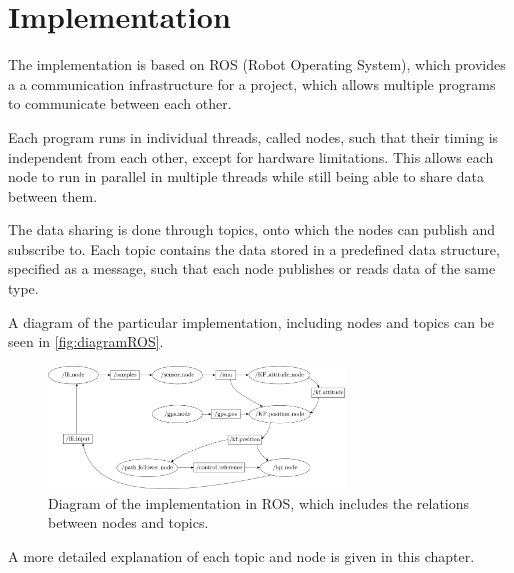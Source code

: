 \chapter{Implementation}
The implementation is based on ROS (Robot Operating System), which provides a a communication infrastructure for a project, which allows multiple programs to communicate between each other. 

Each program runs in individual threads, called nodes, such that their timing is independent from each other, except for hardware limitations. This allows each node to run in parallel in multiple threads while still being able to share data between them.

The data sharing is done through topics, onto which the nodes can publish and subscribe to. Each topic contains the data stored in a predefined data structure, specified as a message, such that each node publishes or reads data of the same type.

A diagram of the particular implementation, including nodes and topics can be seen in \autoref{fig:diagramROS}.

\begin{figure}[H]
    \includegraphics[width=0.7\textwidth]{figures/diagramROS}
    \caption{Diagram of the implementation in ROS, which includes the relations between nodes and topics.}
    \label{fig:diagramROS}
\end{figure}

A more detailed explanation of each topic and node is given in this chapter.




